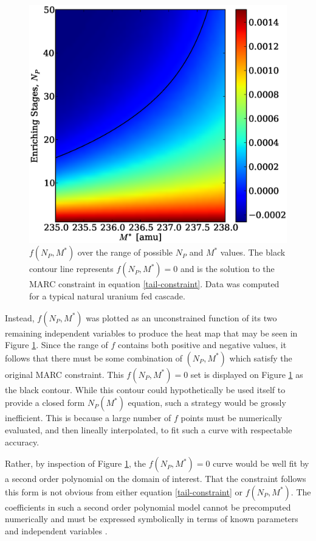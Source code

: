 \documentclass[preprint,12pt]{elsarticle}
\begin{document}
\begin{figure}[htpb]
\begin{center}
\includegraphics[scale=0.5]{np_constraint.eps}
\caption{$f(N_P, M^*)$ over the range of possible $N_P$ and $M^*$ values.  The black
contour line represents $f(N_P, M^*)=0$ and is the solution to the MARC constraint
in equation \ref{tail-constraint}. 
Data was computed for a typical natural uranium fed cascade.}
\label{np_constraint_fig}
\end{center}
\end{figure}

Instead, $f(N_P,M^*)$ was plotted as an unconstrained function of its two remaining 
independent variables to produce the heat map that may be seen in Figure 
\ref{np_constraint_fig}.  Since the range of $f$ contains both positive and negative
values, it follows that there must be some combination of $(N_P,M^*)$ which
satisfy the original MARC constraint.  This $f(N_P, M^*)=0$ set is displayed on Figure 
\ref{np_constraint_fig} as the black contour.  While this contour could hypothetically
be used itself to provide a closed form $N_P(M^*)$ equation, such a strategy would 
be grossly inefficient.  This is because a large number of $f$ points must be 
numerically evaluated, and then lineally interpolated, to fit such a curve with
respectable accuracy.

Rather, by inspection of Figure \ref{np_constraint_fig}, the $f(N_P, M^*)=0$ curve 
would be well fit by a second order polynomial on the domain of interest.
That the constraint follows this form is not obvious from either equation 
\ref{tail-constraint} or $f(N_P,M^*)$.  The coefficients in 
such a second order polynomial model cannot be precomputed  numerically and must be 
expressed symbolically in terms of known parameters and independent variables 
\cite{Sacks:1989:ASS:1623755.1623823}.
\end{document}
